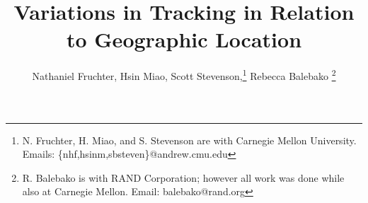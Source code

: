 \documentclass[conference]{IEEEtran}
\begin{document}
%
\title{Variations in Tracking in Relation to Geographic Location}
%
%
%

\author{ Nathaniel Fruchter,
        Hsin Miao,
        Scott Stevenson,\thanks{N. Fruchter, H. Miao, and S. Stevenson are with Carnegie Mellon University. Emails: \{nhf,hsinm,sbsteven\}@andrew.cmu.edu}
        Rebecca Balebako \thanks{R. Balebako is with RAND Corporation; however all work was done while also at Carnegie Mellon. Email: balebako@rand.org}
        }%
% 
%



% 
\end{document}
